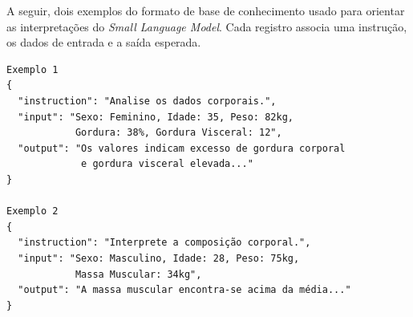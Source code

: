 A seguir, dois exemplos do formato de base de conhecimento usado para orientar as
interpretações do \emph{Small Language Model}. Cada registro associa uma instrução, os dados
de entrada e a saída esperada.

\begin{verbatim}
Exemplo 1
{
  "instruction": "Analise os dados corporais.",
  "input": "Sexo: Feminino, Idade: 35, Peso: 82kg,
            Gordura: 38%, Gordura Visceral: 12",
  "output": "Os valores indicam excesso de gordura corporal
             e gordura visceral elevada..."
}

Exemplo 2
{
  "instruction": "Interprete a composição corporal.",
  "input": "Sexo: Masculino, Idade: 28, Peso: 75kg,
            Massa Muscular: 34kg",
  "output": "A massa muscular encontra-se acima da média..."
}
\end{verbatim}
